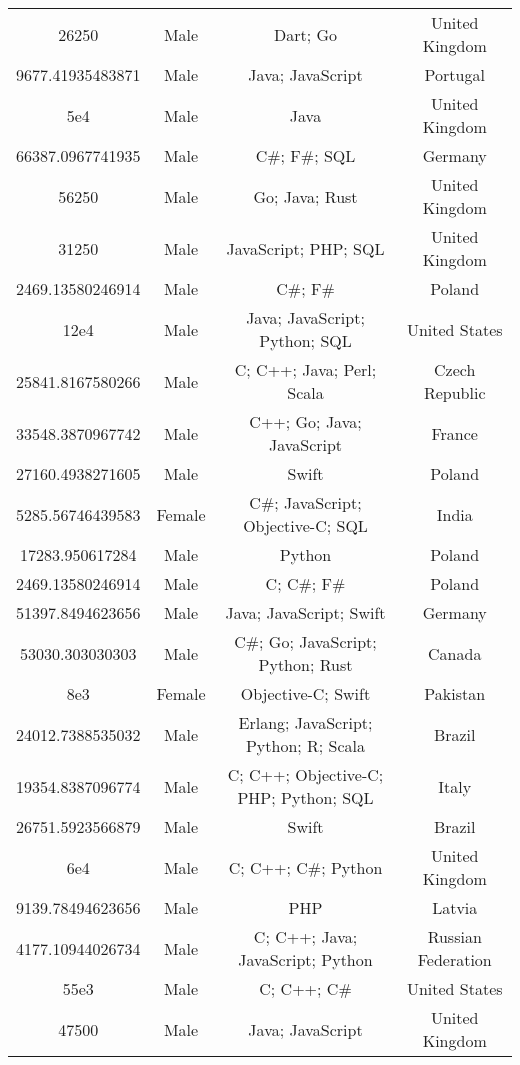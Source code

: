 \begin{center}
\begin{tabular}{ |c|c|c|c| }
26250  &  Male  &  Dart; Go  &  United Kingdom  \\ 
9677.41935483871  &  Male  &  Java; JavaScript  &  Portugal  \\ 
5e4  &  Male  &  Java  &  United Kingdom  \\ 
66387.0967741935  &  Male  &  C\#; F\#; SQL  &  Germany  \\ 
56250  &  Male  &  Go; Java; Rust  &  United Kingdom  \\ 
31250  &  Male  &  JavaScript; PHP; SQL  &  United Kingdom  \\ 
2469.13580246914  &  Male  &  C\#; F\#  &  Poland  \\ 
12e4  &  Male  &  Java; JavaScript; Python; SQL  &  United States  \\ 
25841.8167580266  &  Male  &  C; C++; Java; Perl; Scala  &  Czech Republic  \\ 
33548.3870967742  &  Male  &  C++; Go; Java; JavaScript  &  France  \\ 
27160.4938271605  &  Male  &  Swift  &  Poland  \\ 
5285.56746439583  &  Female  &  C\#; JavaScript; Objective-C; SQL  &  India  \\ 
17283.950617284  &  Male  &  Python  &  Poland  \\ 
2469.13580246914  &  Male  &  C; C\#; F\#  &  Poland  \\ 
51397.8494623656  &  Male  &  Java; JavaScript; Swift  &  Germany  \\ 
53030.303030303  &  Male  &  C\#; Go; JavaScript; Python; Rust  &  Canada  \\ 
8e3  &  Female  &  Objective-C; Swift  &  Pakistan  \\ 
24012.7388535032  &  Male  &  Erlang; JavaScript; Python; R; Scala  &  Brazil  \\ 
19354.8387096774  &  Male  &  C; C++; Objective-C; PHP; Python; SQL  &  Italy  \\ 
26751.5923566879  &  Male  &  Swift  &  Brazil  \\ 
6e4  &  Male  &  C; C++; C\#; Python  &  United Kingdom  \\ 
9139.78494623656  &  Male  &  PHP  &  Latvia  \\ 
4177.10944026734  &  Male  &  C; C++; Java; JavaScript; Python  &  Russian Federation  \\ 
55e3  &  Male  &  C; C++; C\#  &  United States  \\ 
47500  &  Male  &  Java; JavaScript  &  United Kingdom  \\ 

\end{tabular}
\end{center}
